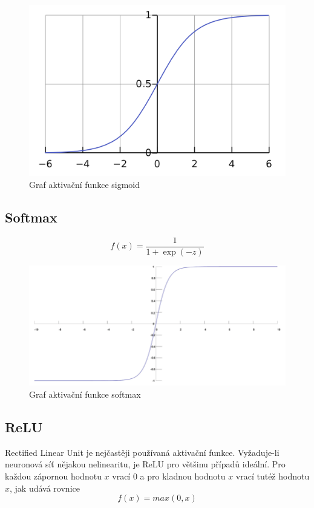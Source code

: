 \begin{figure}[H]
    \centering
    \includegraphics[scale=0.18]{obrazky-figures/sigmoid.png}
    \caption{\label{fig:sigmoid}Graf aktivační funkce sigmoid}
\end{figure}



\subsection*{Softmax}
\begin{equation}
  f(x) = \frac{1}{1+\exp(-z)}
\end{equation}


\begin{figure}[H]
    \centering
    \includegraphics[scale=0.35]{obrazky-figures/softmax.png}
    \caption{\label{fig:softmax}Graf aktivační funkce softmax}
\end{figure}




\subsection*{ReLU}
Rectified Linear Unit je nejčastěji používaná aktivační funkce. Vyžaduje-li neuronová síť nějakou nelinearitu, je ReLU pro většinu případů ideální. Pro každou zápornou hodnotu $x$ vrací $0$ a pro kladnou hodnotu $x$ vrací tutéž hodnotu $x$, jak udává rovnice 
\begin{equation}
   f(x)=max(0,x)
\end{equation}

